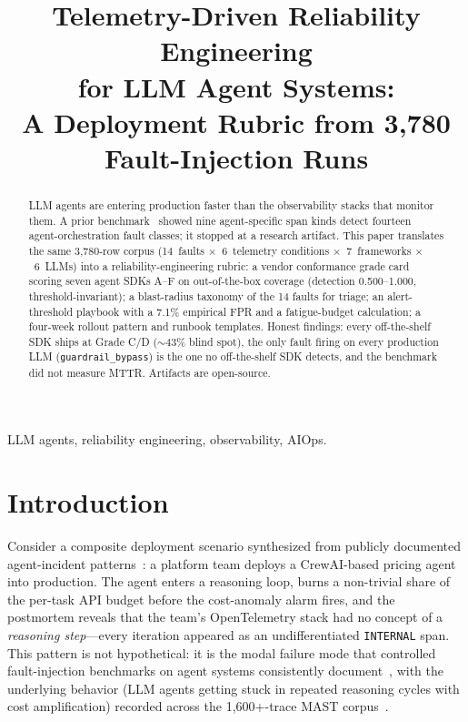 \documentclass[conference]{IEEEtran}
\begin{document}
\title{Telemetry-Driven Reliability Engineering\\
for LLM Agent Systems:\\
A Deployment Rubric from 3{,}780 Fault-Injection Runs}

\author{
}

\maketitle

\begin{abstract}
LLM agents are entering production faster than the observability
stacks that monitor them. A prior benchmark~\cite{agenttelemetry_aiware}
showed nine agent-specific span kinds detect fourteen
agent-orchestration fault classes; it stopped at a research artifact.
This paper translates the same 3{,}780-row corpus (14~faults
$\times$~6~telemetry conditions $\times$~7~frameworks $\times$~6~LLMs)
into a reliability-engineering rubric: a vendor conformance grade
card scoring seven agent SDKs A--F on out-of-the-box coverage
(detection 0.500--1.000, threshold-invariant); a blast-radius
taxonomy of the 14 faults for triage; an alert-threshold playbook
with a 7.1\% empirical FPR and a fatigue-budget calculation; a
four-week rollout pattern and runbook templates. Honest findings:
every off-the-shelf SDK ships at Grade C/D ($\sim$43\% blind spot),
the only fault firing on every production LLM
(\texttt{guardrail\_bypass}) is the one no off-the-shelf SDK detects,
and the benchmark did not measure MTTR. Artifacts are open-source.
\end{abstract}

\begin{IEEEkeywords}
LLM agents, reliability engineering, observability, AIOps.
\end{IEEEkeywords}

\section{Introduction}
\label{sec:introduction}

Consider a composite deployment scenario synthesized from
publicly documented agent-incident patterns~\cite{mast,agenttelemetry_aiware}:
a platform team deploys a CrewAI-based pricing agent into production.
The agent enters a reasoning loop, burns a non-trivial share of the
per-task API budget before the cost-anomaly alarm fires, and the
postmortem reveals that the team's OpenTelemetry stack had no concept
of a \emph{reasoning step}---every iteration appeared as an
undifferentiated \texttt{INTERNAL} span. This pattern is not
hypothetical: it is the modal failure mode that controlled
fault-injection benchmarks on agent systems consistently
document~\cite{agenttelemetry_aiware,mast}, with the underlying
behavior (LLM agents getting stuck in repeated reasoning cycles with
cost amplification) recorded across the
1{,}600+-trace MAST corpus~\cite{mast}.
\end{document}
